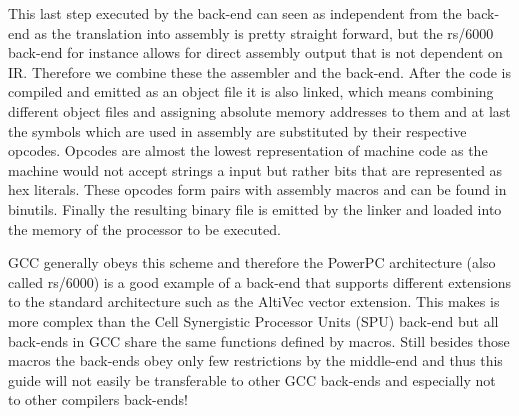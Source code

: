 This last step executed by the back-end can seen as independent from the back-end as the translation into assembly is pretty straight forward, but the rs/6000 back-end for instance allows for direct assembly output that is not dependent on IR. Therefore we combine these the assembler and the back-end.
After the code is compiled and emitted as an object file it is also linked, which means combining different object files and assigning absolute memory addresses to them and at last the symbols which are used in assembly are substituted by their respective opcodes. Opcodes are almost the lowest representation of machine code as the machine would not accept strings a input but rather bits that are represented as hex literals. These opcodes form pairs with assembly macros and can be found in binutils. Finally the resulting binary file is emitted by the linker and loaded into the memory of the processor to be executed.

GCC generally obeys this scheme and therefore the PowerPC architecture (also called rs/6000) is a good example of a back-end that supports different extensions to the standard architecture such as the AltiVec vector extension. This makes is more complex than the Cell Synergistic Processor Units (SPU) back-end but all back-ends in GCC share the same functions defined by macros. Still besides those macros the back-ends obey only few restrictions by the middle-end and thus this guide will not easily be transferable to other GCC back-ends and especially not to other compilers back-ends!
